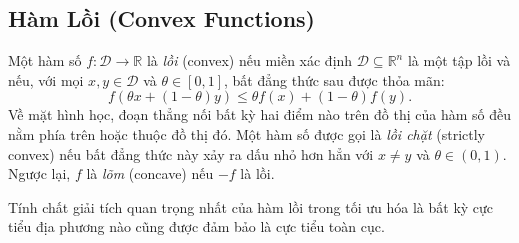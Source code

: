 
\subsection{Hàm Lồi (Convex Functions)}
Một hàm số $f: \mathcal{D} \to \mathbb{R}$ là \textit{lồi} (convex) nếu miền xác định $\mathcal{D} \subseteq \mathbb{R}^n$ là một tập lồi và nếu, với mọi $x, y \in \mathcal{D}$ và $\theta \in [0, 1]$, bất đẳng thức sau được thỏa mãn:
\begin{equation}
f(\theta x + (1-\theta)y) \leq \theta f(x) + (1-\theta)f(y).
\end{equation}
Về mặt hình học, đoạn thẳng nối bất kỳ hai điểm nào trên đồ thị của hàm số đều nằm phía trên hoặc thuộc đồ thị đó. Một hàm số được gọi là \textit{lồi chặt} (strictly convex) nếu bất đẳng thức này xảy ra dấu nhỏ hơn hẳn với $x \neq y$ và $\theta \in (0, 1)$. Ngược lại, $f$ là \textit{lõm} (concave) nếu $-f$ là lồi.

Tính chất giải tích quan trọng nhất của hàm lồi trong tối ưu hóa là bất kỳ cực tiểu địa phương nào cũng được đảm bảo là cực tiểu toàn cục.

